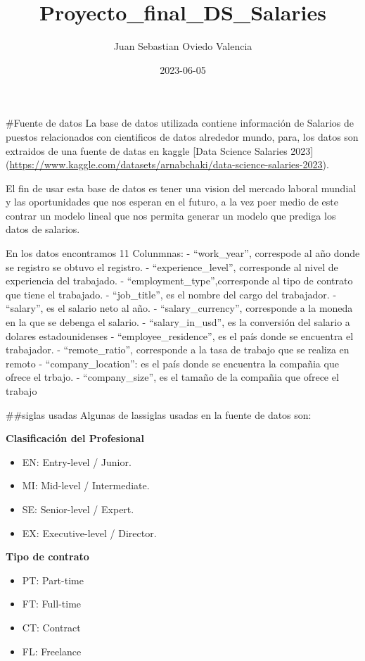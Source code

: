 \documentclass[
]{article}
\title{Proyecto\_final\_DS\_Salaries}
\author{Juan Sebastian Oviedo Valencia}
\date{2023-06-05}
\providecommand{\tightlist}{%
  \setlength{\itemsep}{0pt}\setlength{\parskip}{0pt}}
\begin{document}
\maketitle

\#Fuente de datos La base de datos utilizada contiene información de
Salarios de puestos relacionados con cientificos de datos alrededor
mundo, para, los datos son extraidos de una fuente de datas en kaggle
{[}Data Science Salaries 2023{]}
(\url{https://www.kaggle.com/datasets/arnabchaki/data-science-salaries-2023}).

El fin de usar esta base de datos es tener una vision del mercado
laboral mundial y las oportunidades que nos esperan en el futuro, a la
vez poer medio de este contrar un modelo lineal que nos permita generar
un modelo que prediga los datos de salarios.

En los datos encontramos 11 Colunmnas: - ``work\_year'', correspode al
año donde se registro se obtuvo el registro. - ``experience\_level'',
corresponde al nivel de experiencia del trabajado. -
``employment\_type'',corresponde al tipo de contrato que tiene el
trabajado. - ``job\_title'', es el nombre del cargo del trabajador. -
``salary'', es el salario neto al año. - ``salary\_currency'',
corresponde a la moneda en la que se debenga el salario. -
``salary\_in\_usd'', es la conversión del salario a dolares
estadounidenses - ``employee\_residence'', es el país donde se encuentra
el trabajador. - ``remote\_ratio'', corresponde a la tasa de trabajo que
se realiza en remoto - ``company\_location'': es el país donde se
encuentra la compañia que ofrece el trbajo. - ``company\_size'', es el
tamaño de la compañia que ofrece el trabajo

\#\#siglas usadas Algunas de lassiglas usadas en la fuente de datos son:

\textbf{Clasificación del Profesional}

\begin{itemize}
\tightlist
\item
  EN: Entry-level / Junior.
\item
  MI: Mid-level / Intermediate.
\item
  SE: Senior-level / Expert.
\item
  EX: Executive-level / Director.
\end{itemize}

\textbf{Tipo de contrato}

\begin{itemize}
\tightlist
\item
  PT: Part-time
\item
  FT: Full-time
\item
  CT: Contract
\item
  FL: Freelance
\end{itemize}
\end{document}

